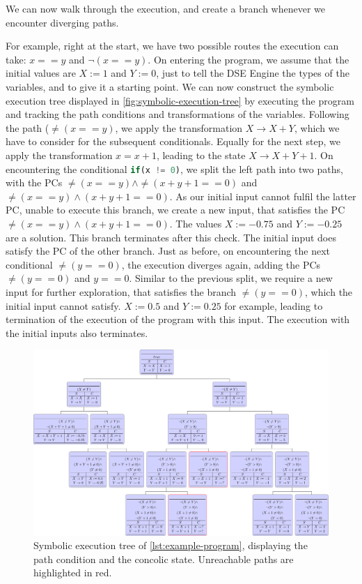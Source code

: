 We can now walk through the execution, and create a branch whenever we encounter diverging paths.

For example, right at the start, we have two possible routes the execution can take: $x == y$ and $\neg(x == y)$.
On entering  the program, we assume that the initial values are $X:=1$ and $Y:=0$, just to tell the DSE Engine the types of the variables, and to give it a starting point. 
We can now construct the symbolic execution tree displayed in \autoref{fig:symbolic-execution-tree} by executing the program and tracking the path conditions and transformations of the variables.
Following the path ($\neq(x == y)$, we apply the transformation $X \rightarrow X+Y $, which we have to consider for the subsequent conditionals. Equally for the next step, we apply the transformation $x=x+1$, leading to the state $X \rightarrow X + Y + 1$.
On encountering the conditional \lstinline[language=JavaScript]+if(x != 0)+,  we split the left path into two paths, with the PCs $\neq (x == y) \wedge \neq(x+y+1 == 0)$ and $\neq (x == y) \wedge (x+y+1 == 0)$. 
As our initial input cannot fulfil the latter PC, unable to execute this branch, we create a new input, that satisfies the PC $\neq (x == y) \wedge (x+y+1 == 0)$. The values $X := -0.75$ and $Y := -0.25$ are a solution. This branch terminates after this check. The initial input does satisfy the PC of the other branch. Just as before, on encountering the next conditional $\neq(y == 0)$, the execution diverges again, adding the PCs $\neq(y == 0)$ and $y == 0$. Similar to the previous split, we require a new input for further exploration, that satisfies the branch $\neq(y == 0)$, which the initial input cannot satisfy. $X:= 0.5$ and $Y := 0.25$ for example, leading to termination of the execution of the program with this input. The execution with the initial inputs also terminates.

\begin{figure}
  \centering
  \includegraphics[width=\textwidth]{../luatex/symexe/out/symexe.pdf}    
  \caption[Symbolic execution tree]{Symbolic execution tree of \autoref{lst:example-program}, displaying the path condition and the concolic state. Unreachable paths are highlighted in red.}
  \label{fig:symbolic-execution-tree}
\end{figure}


